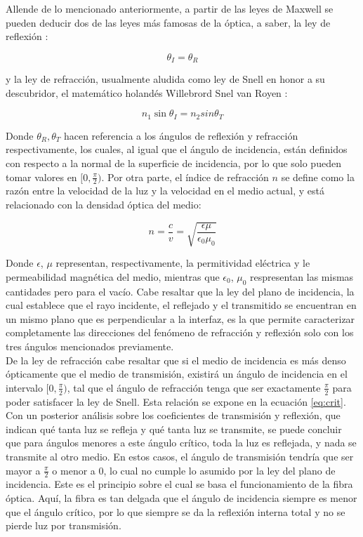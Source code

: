 \documentclass[prb,aps,twocolumn,preprintnumbers,amsmath,amssymb]{revtex4}
\begin{document}
Allende de lo mencionado anteriormente, a partir de las leyes de Maxwell se pueden deducir dos de las leyes más famosas de la óptica, a saber, la ley de reflexión \cite{Griffiths}:

\begin{equation}
\label{eq:reflexion}
\theta_I = \theta_R
\end{equation}

y la ley de refracción, usualmente aludida como ley de Snell en honor a su descubridor, el matemático holandés Willebrord Snel van Royen \cite{Griffiths}: 

\begin{equation}
n_1\sin{\theta_I} = n_2sin{\theta_T}
\label{eq:refraccion}
\end{equation}

Donde $\theta_R, \theta_T$ hacen referencia a los ángulos de reflexión y refracción respectivamente, los cuales, al igual que el ángulo de incidencia, están definidos con respecto a la normal de la superficie de incidencia, por lo que solo pueden tomar valores en $[0,\frac{\pi}{2})$. Por otra parte, el índice de refracción $n$ se define como la razón entre la velocidad de la luz y la velocidad en el medio actual, y está relacionado con la densidad óptica del medio:

\begin{equation}
n = \frac{c}{v} = \sqrt{\frac{\epsilon\mu}{\epsilon_0\mu_0}}
\label{eq:indice}
\end{equation}

Donde $\epsilon$, $\mu$ representan,  respectivamente, la permitividad eléctrica y le permeabilidad magnética del medio, mientras que $\epsilon_0$, $\mu_0$ respresentan las mismas cantidades pero para el vacío. Cabe resaltar que la ley del plano de incidencia, la cual establece que el rayo incidente, el reflejado y el transmitido se encuentran en un mismo plano que es perpendicular a la interfaz, es la que permite caracterizar completamente las direcciones del fenómeno de refracción y reflexión solo con los tres ángulos mencionados previamente.\\

De la ley de refracción cabe resaltar que si el medio de incidencia es más denso ópticamente que el medio de transmisión, existirá un ángulo de incidencia en el intervalo $[0,\frac{\pi}{2})$, tal que el ángulo de refracción tenga que ser exactamente $\frac{\pi}{2}$ para poder satisfacer la ley de Snell. Esta relación se expone en la ecuación \eqref{eq:crit}. Con un posterior análisis sobre los coeficientes de transmisión y reflexión, que indican qué tanta luz se refleja y qué tanta luz se transmite, se puede concluir que para ángulos menores a este ángulo crítico, toda la luz es reflejada, y nada se transmite al otro medio. En estos casos, el ángulo de transmisión tendría que ser mayor a $\frac{\pi}{2}$ o menor a $0$, lo cual no cumple lo asumido por la ley del plano de incidencia. Este es el principio sobre el cual se basa el funcionamiento de la fibra óptica. Aquí, la fibra es tan delgada que el ángulo de incidencia siempre es menor que el ángulo crítico, por lo que siempre se da la reflexión interna total y no se pierde luz por transmisión.
\end{document}
